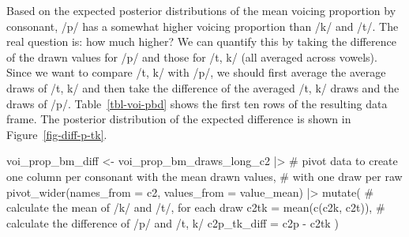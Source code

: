 \documentclass[
  authoryear,
  preprint,
  3p]{elsarticle}
\newenvironment{Shaded}{\begin{snugshade}}{\end{snugshade}}
\newcommand{\AttributeTok}[1]{\textcolor[rgb]{0.40,0.45,0.13}{#1}}
\newcommand{\CommentTok}[1]{\textcolor[rgb]{0.37,0.37,0.37}{#1}}
\newcommand{\FunctionTok}[1]{\textcolor[rgb]{0.28,0.35,0.67}{#1}}
\newcommand{\NormalTok}[1]{\textcolor[rgb]{0.00,0.23,0.31}{#1}}
\newcommand{\OtherTok}[1]{\textcolor[rgb]{0.00,0.23,0.31}{#1}}
\newcommand{\SpecialCharTok}[1]{\textcolor[rgb]{0.37,0.37,0.37}{#1}}
\begin{document}
Based on the expected posterior distributions of the mean voicing
proportion by consonant, /p/ has a somewhat higher voicing proportion
than /k/ and /t/. The real question is: how much higher? We can quantify
this by taking the difference of the drawn values for /p/ and those for
/t, k/ (all averaged across vowels). Since we want to compare /t, k/
with /p/, we should first average the average draws of /t, k/ and then
take the difference of the averaged /t, k/ draws and the draws of /p/.
Table~\ref{tbl-voi-pbd} shows the first ten rows of the resulting data
frame. The posterior distribution of the expected difference is shown in
Figure~\ref{fig-diff-p-tk}.

\begin{Shaded}
\begin{Highlighting}[]
\NormalTok{voi\_prop\_bm\_diff }\OtherTok{\textless{}{-}}\NormalTok{ voi\_prop\_bm\_draws\_long\_c2 }\SpecialCharTok{|\textgreater{}} 
  \CommentTok{\# pivot data to create one column per consonant with the mean drawn values,}
  \CommentTok{\# with one draw per raw}
  \FunctionTok{pivot\_wider}\NormalTok{(}\AttributeTok{names\_from =}\NormalTok{ c2, }\AttributeTok{values\_from =}\NormalTok{ value\_mean) }\SpecialCharTok{|\textgreater{}} 
  \FunctionTok{mutate}\NormalTok{(}
    \CommentTok{\# calculate the mean of /k/ and /t/, for each draw}
    \AttributeTok{c2tk =} \FunctionTok{mean}\NormalTok{(}\FunctionTok{c}\NormalTok{(c2k, c2t)),}
    \CommentTok{\# calculate the difference of /p/ and /t, k/}
    \AttributeTok{c2p\_tk\_diff =}\NormalTok{ c2p }\SpecialCharTok{{-}}\NormalTok{ c2tk}
\NormalTok{  )}
\end{Highlighting}
\end{Shaded}
\end{document}
